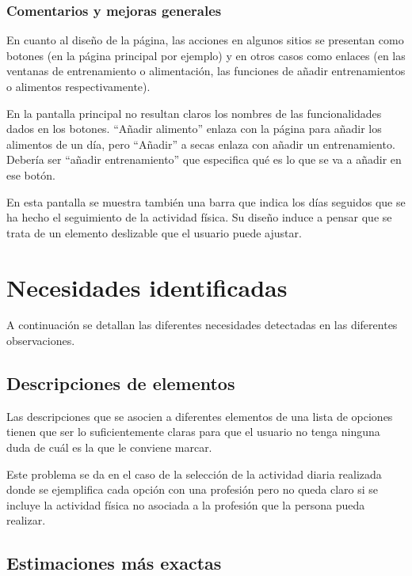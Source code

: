 \documentclass[a4paper]{article}
\begin{document}
			\subsubsection*{Comentarios y mejoras generales}
			
			En cuanto al diseño de la página, las acciones en algunos sitios se presentan como botones (en la página principal por ejemplo) y en otros casos como enlaces (en las ventanas de entrenamiento o alimentación, las funciones de añadir entrenamientos o alimentos respectivamente).
			
			En la pantalla principal no resultan claros los nombres de las funcionalidades dados en los botones. ``Añadir alimento'' enlaza con la página para añadir los alimentos de un día, pero ``Añadir'' a secas enlaza con añadir un entrenamiento. Debería ser ``añadir entrenamiento'' que especifica qué es lo que se va a añadir en ese botón.
			
			En esta pantalla se muestra también una barra que indica los días seguidos que se ha hecho el seguimiento de la actividad física. Su diseño induce a pensar que se trata de un elemento deslizable que el usuario puede ajustar.
			
		\FloatBarrier
		

\section{Necesidades identificadas}

A continuación se detallan las diferentes necesidades detectadas en las diferentes observaciones.

	\subsection{Descripciones de elementos}
	
	Las descripciones que se asocien a diferentes elementos de una lista de opciones tienen que ser lo suficientemente claras para que el usuario no tenga ninguna duda de cuál es la que le conviene marcar.
	
	Este problema se da en el caso de la selección de la actividad diaria realizada donde se ejemplifica cada opción con una profesión pero no queda claro si se incluye la actividad física no asociada a la profesión que la persona pueda realizar.
	
	\subsection{Estimaciones más exactas}
	
\end{document}
